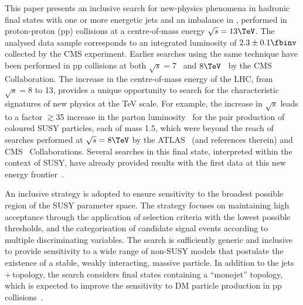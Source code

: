 This paper presents an inclusive search for new-physics phenomena in
hadronic final states with one or more energetic jets and an imbalance
in \ptvecmiss, performed in proton-proton (pp) collisions at a
centre-of-mass energy $\sqrt{s} = 13\TeV$. The analysed data sample
corresponds to an integrated luminosity of $2.3 \pm 0.1
\fbinv$ %
collected by the CMS experiment. Earlier searches using the same
technique have been performed in pp collisions at both $\sqrt{s} =
7$~\cite{RA1Paper, RA1Paper2011, RA1Paper2011FULL} and
$8\TeV$~\cite{RA1Paper2012, RA1Parked} by the CMS Collaboration.
The increase in the centre-of-mass energy of the LHC, from $\sqrt{s} =
8$ to 13\TeV, provides a unique opportunity to search for the
characteristic signatures of new physics at the TeV scale. For
example, the increase in $\sqrt{s}$ leads to a factor $\gtrsim$35
increase in the parton luminosity~\cite{susynlo} for the pair
production of coloured SUSY particles, each of mass 1.5\TeV, which
were beyond the reach of searches performed at $\sqrt{s} = 8\TeV$ by
the ATLAS~\cite{Aad:2015iea, Aad:2015pfx} (and references therein) and
CMS~\cite{CMS:2014dpa, Khachatryan:2015vra, Khachatryan:2016oia,
  Chatrchyan:2013wxa, Chatrchyan:2014lfa, Khachatryan:2015pwa,
  Khachatryan:2015wza, Khachatryan:2016zcu} Collaborations. Several
searches in this final state, interpreted within the context of SUSY,
have already provided results with the first data at this new energy
frontier~\cite{Aad:2016jxj, Aaboud:2016tnv, Aaboud:2016zdn,
  Aad:2016eki, Aaboud:2016nwl, Khachatryan:2016kdk, cms-13}.

An inclusive strategy is adopted to ensure sensitivity to the broadest
possible region of the SUSY parameter space. The strategy focuses on
maintaining high acceptance through the application of selection
criteria with the lowest possible thresholds, and the categorisation
of candidate signal events according to multiple discriminating
variables.  The search is sufficiently generic and inclusive to
provide sensitivity to a wide range of non-SUSY %
models that postulate the existence of a stable, weakly interacting,
massive particle. In addition to the jets$\,$+$\,$\ptvecmiss topology,
the search considers final states containing a ``monojet'' topology,
which is expected to improve the sensitivity to DM particle production
in pp collisions~\cite{Fox:2012ee, Buchmueller:2015eea}.

